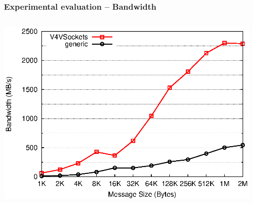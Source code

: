 \documentclass[red,slidestop,notes,compress,mathserif]{beamer}
\begin{document}
\begin{frame}
\frametitle{Experimental evaluation -- Bandwidth}
\begin{columns}
\includegraphics[width=\textwidth]{figures/v4v_bw.eps}
\end{columns}
\end{frame}

\end{document}
